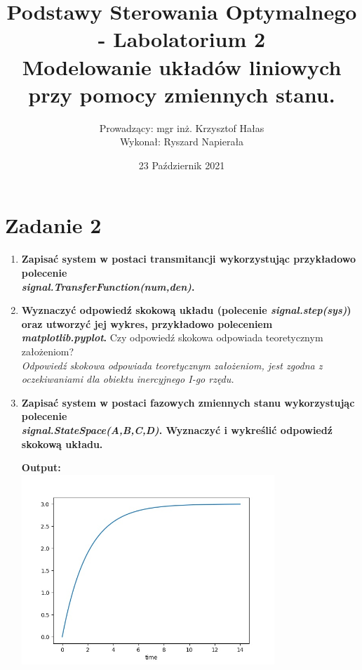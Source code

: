 \documentclass[12pt]{article}
\title{
    \huge Podstawy Sterowania Optymalnego - Labolatorium 2\\
    \large Modelowanie układów liniowych przy pomocy zmiennych stanu.
}
\author{Prowadzący: mgr inż. Krzysztof Hałas\\
        Wykonał: Ryszard Napierała}
\date{23 Październik 2021}
\begin{document}
    \maketitle


    \section{Zadanie 2}
        \begin{enumerate}
            

            \item\textbf{Zapisać system w postaci transmitancji wykorzystując
            przykładowo polecenie\\
            \emph{signal.TransferFunction(num,den)}.}

            \item\textbf{Wyznaczyć odpowiedź skokową układu
            (polecenie \emph{signal.step(sys)}) oraz utworzyć jej
            wykres, przykładowo poleceniem \emph{matplotlib.pyplot}.}
                Czy odpowiedź skokowa odpowiada teoretycznym założeniom?\\
                \emph{Odpowiedź skokowa odpowiada teoretycznym założeniom, jest zgodna z
                oczekiwaniami dla obiektu inercyjnego I-go rzędu.}

            \item\textbf{Zapisać system w postaci fazowych zmiennych stanu wykorzystując polecenie\\
            \emph{signal.StateSpace(A,B,C,D)}. Wyznaczyć i wykreślić odpowiedź skokową układu.}
                \begin{shbox}
                    \centering
                    \textbf{Output:} \\
                    \includegraphics[width=0.75\textwidth]{lab2/zad2_5.jpg}
                \end{shbox}


\end{enumerate}
\end{document}
